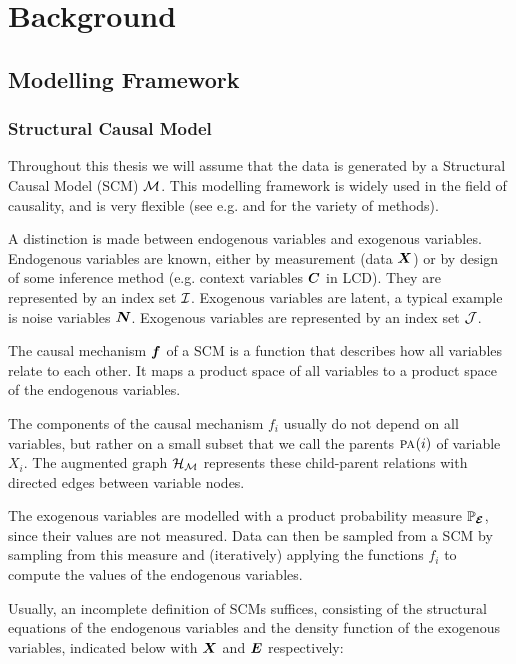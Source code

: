 \newpage
\section{Background}
\label{chapter:background}

\subsection{Modelling Framework}

\subsubsection{Structural Causal Model}
Throughout this thesis we will assume that the data is generated by a Structural Causal Model (SCM) $\mathcal{M}$. This modelling framework is widely used in the field of causality, and is very flexible (see e.g. \citet{pearl2009causality} and \citet{peters2017elements} for the variety of methods). 

A distinction is made between endogenous variables and exogenous variables. Endogenous variables are known, either by measurement (data $\bm{X}$) or by design of some inference method (e.g. context variables $\bm{C}$ in LCD). They are represented by an index set $\mathcal{I}$. Exogenous variables are latent, a typical example is noise variables $\bm{N}$. Exogenous variables are represented by an index set $\mathcal{J}$.

The causal mechanism $\bm{f}$ of a SCM is a function that describes how all variables relate to each other. It maps a product space of all variables to a product space of the endogenous variables. 

The components of the causal mechanism $f_i$ usually do not depend on all variables, but rather on a small subset that we call the parents $\text{\normalfont\scshape pa}_{}(i)$ of variable $X_i$. The augmented graph $\mathcal{H}_{\mathcal{M}}$ represents these child-parent relations with directed edges between variable nodes.

The exogenous variables are modelled with a product probability measure $\mathbb{P}_{\bm{\mathcal{E}}}$, since their values are not measured. Data can then be sampled from a SCM by sampling from this measure and (iteratively) applying the functions $f_i$ to compute the values of the endogenous variables.

Usually, an incomplete definition of SCMs suffices, consisting of the structural equations of the endogenous variables and the density function of the exogenous variables, indicated below with $\bm{X}$ and $\bm{E}$ respectively:

